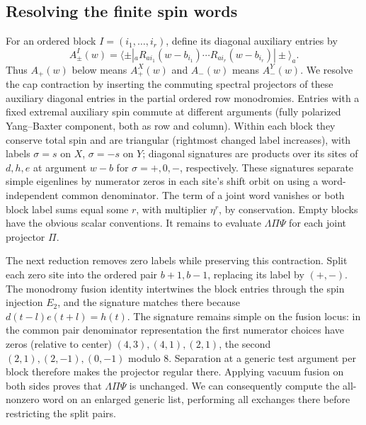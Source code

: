 \subsection{Resolving the finite spin words}

For an ordered block $I=(i_1,\ldots,i_r)$, define its diagonal auxiliary entries by
\[
 A^{I}_{\pm}(w)=\langle\pm|_a
 R_{a i_1}(w-b_{i_1})\cdots R_{a i_r}(w-b_{i_r})|\pm\rangle_a.
\]
Thus $A_+(w)$ below means $A^X_+(w)$ and $A_-(w)$ means $A^Y_-(w)$. We resolve the cap contraction by inserting the commuting spectral projectors of these auxiliary diagonal entries in the partial ordered row monodromies. Entries with a fixed extremal auxiliary spin commute at different arguments (fully polarized Yang--Baxter component, both as row and column). Within each block they conserve total spin and are triangular (rightmost changed label increases), with labels \(\sigma=s\) on \(X\), \(\sigma=-s\) on \(Y\); diagonal signatures are products over its sites of \(d,h,e\) at argument \(w-b\) for \(\sigma=+,0,-\), respectively. These signatures separate simple eigenlines by numerator zeros in each site's shift orbit on using a word-independent common denominator. The term of a joint word vanishes or both block label sums equal some \(r\), with multiplier \(\eta^r\), by conservation. Empty blocks have the obvious scalar conventions. It remains to evaluate \(\Lambda\Pi\Psi\) for each joint projector \(\Pi\).

The next reduction removes zero labels while preserving this contraction. Split each zero site into the ordered pair \(b+1,b-1\), replacing its label by \((+,-)\). The monodromy fusion identity intertwines the block entries through the spin injection \(E_2\), and the signature matches there because \(d(t-l)e(t+l)=h(t)\). The signature remains simple on the fusion locus: in the common pair denominator representation the first numerator choices have zeros (relative to center) \((4,3),(4,1),(2,1)\), the second \((2,1),(2,-1),(0,-1)\) modulo 8. Separation at a generic test argument per block therefore makes the projector regular there. Applying vacuum fusion on both sides proves that \(\Lambda\Pi\Psi\) is unchanged. We can consequently compute the all-nonzero word on an enlarged generic list, performing all exchanges there before restricting the split pairs.


